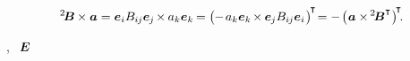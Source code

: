 \begin{otherlanguage}{russian}
\nopagebreak\vspace{-0.3em}\begin{equation*}\label{crossproductisnotcommutative}
{^2\hspace{-0.16em}\bm{B}} \hspace{-0.1ex} \times \bm{a}
= \bm{e}_i B_{i\hspace{-0.1ex}j} \bm{e}_{\hspace{-0.1ex}j} \hspace{-0.25ex} \times \hspace{-0.1ex} a_k \bm{e}_k \hspace{-0.2ex}
= \bigl( \hspace{-0.1ex} - \hspace{.25ex} a_k \bm{e}_k \hspace{-0.25ex} \times \hspace{-0.1ex} \bm{e}_{\hspace{-0.1ex}j} B_{i\hspace{-0.1ex}j} \bm{e}_i \hspace{.16ex} \bigr)^{\hspace{-0.25ex}\T} \hspace{-0.4ex}
= - \hspace{.25ex} \bigl( \hspace{.12ex} \bm{a} \times \hspace{-0.2ex} {^2\hspace{-0.16em}\bm{B}^{\T}} \hspace{.1ex} \bigr)^{\hspace{-0.3ex}\T}
\hspace{-0.4ex} .
\end{equation*}

\vspace{-0.15em} \noindent
{}, ~${\hspace{-0.2ex}\bm{E}}$ ~



\end{otherlanguage}
